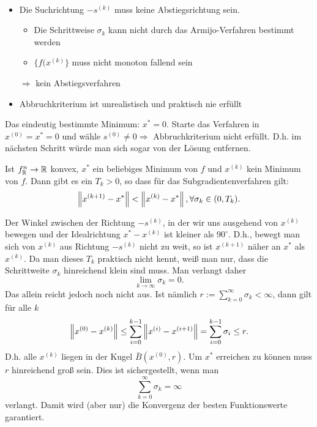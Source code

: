 \begin{Bemerkung}\
\begin{itemize}
  \item Die Suchrichtung $-s^{(k)}$ muss keine Abstiegsrichtung sein. 
  \begin{itemize}
   \item Die Schrittweise $\sigma_k$ kann nicht durch das Armijo-Verfahren bestimmt werden
   \item $\{f(x^{(k)}\}$ muss nicht monoton fallend sein 
  \end{itemize}
  $\Rightarrow$ kein Abstiegsverfahren
  \item Abbruchkriterium ist unrealistisch und praktisch nie erfüllt
 \end{itemize}
\end{Bemerkung}

\begin{Beispiel}[$f(x) = \norm{x}$]
 Das eindeutig bestimmte Minimum: $x^* = 0$.
 Starte das Verfahren in $x^{(0)} = x^* = 0$ und wähle $s^{(0)}\neq 0\Rightarrow$ Abbruchkriterium nicht erfüllt. D.h. 
im nächsten Schritt würde man sich sogar von der Lösung entfernen.
\end{Beispiel}

\begin{Lemma}
 Ist $f_\mathbb R^n\rightarrow\mathbb R$ konvex, $x^*$ ein beliebiges Minimum von $f$ und $x^{(k)}$ kein Minimum von $f$. Dann gibt 
es ein $T_k>0$, so dass für das Subgradientenverfahren gilt:
\begin{equation}
 \left\lVert x^{(k+1)}-x^*\right\rVert < \left\lVert x^{(k)} - x^*\right\rVert, \forall \sigma_k\in (0,T_k).
\end{equation}
\end{Lemma}

\begin{Bemerkung}
 Der Winkel zwischen der Richtung $-s^{(k)}$, in der wir uns ausgehend von $x^{(k)}$ bewegen und der Idealrichtung 
$x^*-x^{(k)}$ ist kleiner als $90^\circ$. D.h., bewegt man sich von $x^{(k)}$ aus Richtung $-s^{(k)}$ nicht zu weit, so 
ist $x^{(k+1)}$ näher an $x^*$ als 
$x^{(k)}$. Da man dieses $T_k$ praktisch nicht kennt, weiß man nur, dass die Schrittweite $\sigma_k$ hinreichend klein 
sind muss. 
Man verlangt daher
\begin{equation}
 \lim_{k\rightarrow\infty} \sigma_k = 0.
\end{equation}
Das allein reicht jedoch noch nicht aus. 
Ist nämlich $r:=\sum\limits_{k=0}^\infty \sigma_k < \infty$, dann gilt für alle $k$
\begin{equation}
 \left\lVert x^{(0)}-x^{(k)}\right\rVert \leq \sum\limits_{i=0}^{k-1}\left\lVert x^{(i)}-x^{(i+1)}\right\rVert = \sum\limits_{i=0}^{k-1} \sigma_i \leq r.
\end{equation}
D.h. alle $x^{(k)}$ liegen in der Kugel $\bar{B}(x^{(0)},r)$.
Um $x^*$ erreichen zu können muss $r$ hinreichend groß sein. Dies ist sichergestellt, wenn man 
\begin{equation}
 \sum\limits_{k=0}^\infty \sigma_k = \infty
\end{equation}
verlangt. Damit wird (aber nur) die Konvergenz der besten Funktionswerte garantiert.
\end{Bemerkung}

